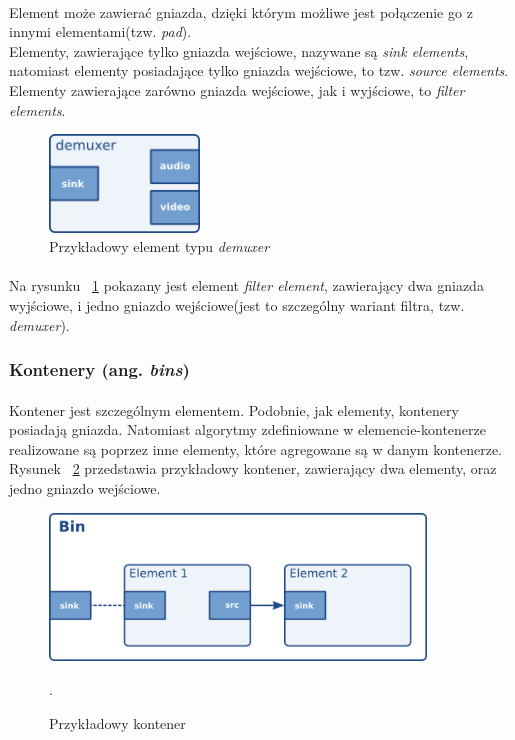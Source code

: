 \documentclass{article}
\begin{document}
\paragraph{}
Element może zawierać gniazda, dzięki którym możliwe jest połączenie go z innymi elementami(tzw. \textit{pad}).\\ 
Elementy, zawierające tylko gniazda wejściowe, nazywane są \textit{sink elements}, natomiast elementy posiadające tylko gniazda wejściowe, to tzw. \textit{source elements}. Elementy zawierające zarówno gniazda wejściowe, jak i wyjściowe, to \textit{filter elements}.
\begin{figure}[H]
  \includegraphics[width=40mm]{img/sample-demuxer.png}
  \caption{Przykładowy element typu \textit{demuxer}}
  \label{fig:sampleDemuxer}
\end{figure}
\paragraph{}
Na rysunku ~\ref{fig:sampleDemuxer} pokazany jest element \textit{filter element}, zawierający dwa gniazda wyjściowe, i jedno gniazdo wejściowe(jest to szczególny wariant filtra, tzw. \textit{demuxer}).
\subsubsection{Kontenery (ang. \textit{bins})}
\paragraph{}
Kontener jest szczególnym elementem. Podobnie, jak elementy, kontenery posiadają gniazda. Natomiast algorytmy zdefiniowane w elemencie-kontenerze realizowane są poprzez inne elementy, które agregowane są w danym kontenerze. Rysunek ~\ref{fig:sampleBin} przedstawia przykładowy kontener, zawierający dwa elementy, oraz jedno gniazdo wejściowe.
\begin{figure}[H]
  \includegraphics[width=100mm]{img/sample-bin.png}
  \caption{Przykładowy kontener}.
  \label{fig:sampleBin}
\end{figure}
\end{document}
